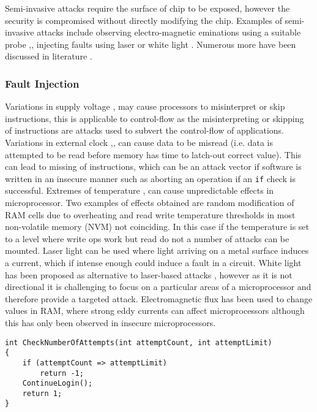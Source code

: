 Semi-invasive attacks  require the surface of chip to be exposed, however the security is compromised without directly modifying the chip. Examples of semi-invasive attacks include observing electro-magnetic eminations using a suitable probe \cite{Gandolfi2007},\cite{Quisquater2001}, injecting faults using laser \cite{Bar-el2006} or white light \cite{Skorobogatov2007}. Numerous more have been discussed in literature \cite{Skorobogatov2005}.

\subsubsection{Fault Injection}

Variations in supply voltage \cite{Anderson1996},\cite{Blomer2010} may cause processors to misinterpret or skip instructions, this is applicable to control-flow as the misinterpreting or skipping of instructions are attacks used to subvert the control-flow of applications.
Variations in external clock \cite{Anderson1996},\cite{Street},\cite{Kommerling1999} can cause data to be misread (i.e. data is attempted to be read before memory has time to latch-out correct value). This can lead to missing of instructions, which can be an attack vector if software is written in an insecure manner such as aborting an operation if an \verb|if| check is successful.
Extremes of temperature \cite{Boneh},\cite{Govindavajhala2003} can cause unpredictable effects in microprocessor. Two examples of effects obtained \cite{Bar-el2006} are random modification of RAM cells due to overheating and read write temperature thresholds in most non-volatile memory (NVM) not coinciding. In this case if the temperature is set to a level where write ops work but read do not a number of attacks can be mounted. Laser light \cite{Habing1965} can be used where light arriving on a metal surface induces a current, which if intense enough could induce a fault in a circuit. White light \cite{Anderson1996} has been proposed as alternative to laser-based attacks  \cite{Skorobogatov2007}, however as it is not directional it is challenging to focus on a particular areas of a microprocessor and therefore provide a targeted attack. Electromagnetic flux \cite{Samyde2003} has been used to change values in RAM, where strong eddy currents can affect microprocessors although this has only been observed in insecure microprocessors.

\begin{lstlisting}[language={[Sharp]C},caption={An example of code which is vulnerable to skipping of instructions},label={lst:instructionSkip}]
int CheckNumberOfAttempts(int attemptCount, int attemptLimit)
{
    if (attemptCount => attemptLimit)
        return -1;
    ContinueLogin();
    return 1;
}
\end{lstlisting}


